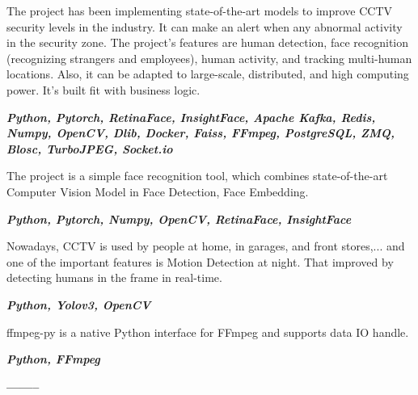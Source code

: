 \documentclass[10pt,a4paper,ragged2e,withhyper]{altacv}
\begin{document}
\begin{minipage}{\linewidth}
	\justifying
	
	The project has been implementing state-of-the-art models to improve CCTV security levels in the industry. It can make an alert when any abnormal activity in the security zone. The project's features are human detection, face recognition (recognizing strangers and employees), human activity, and tracking multi-human locations. Also, it can be adapted to large-scale, distributed, and high computing power.
	\smallskip
	It's built fit with business logic.
	
	\textit{\textbf{Python, Pytorch, RetinaFace, InsightFace, Apache Kafka, Redis, Numpy, OpenCV, Dlib, Docker, Faiss, FFmpeg, PostgreSQL, ZMQ, Blosc, TurboJPEG, Socket.io}}
\end{minipage}

\medskip

\divider

\medskip


\begin{minipage}{\linewidth}
\justifying
The project is a simple face recognition tool, which combines state-of-the-art Computer Vision Model in Face Detection, Face Embedding.
\smallskip

\textit{\textbf{Python, Pytorch, Numpy, OpenCV, RetinaFace, InsightFace}}
\end{minipage}

\medskip

\divider

\medskip

\begin{minipage}{\linewidth}
\justifying
Nowadays, CCTV is used by people at home, in garages, and front stores,... and one of the important features is Motion Detection at night. That improved by detecting humans in the frame in real-time.
\smallskip

\textit{\textbf{Python, Yolov3, OpenCV}}
\end{minipage}

\medskip

\divider

\medskip

\begin{minipage}{\linewidth}
	\justifying
	ffmpeg-py is a native Python interface for FFmpeg and supports data IO handle.
	\smallskip
	
	\textit{\textbf{Python, FFmpeg}}
\end{minipage}

\bigskip
\begin{minipage}{\linewidth}
	\centering
	\textbf{\color{accent}--------}
\end{minipage}
	
\end{document}
